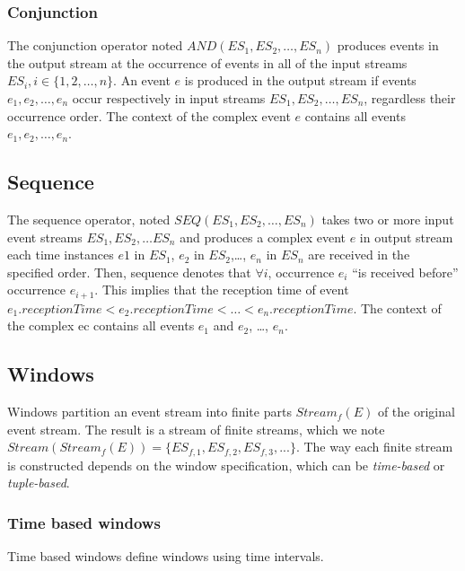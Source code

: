   \subsubsection{Conjunction}
  The conjunction operator noted $AND(ES_1, ES_2, …, ES_n)$ produces events in the output stream at the occurrence of events in all of the input streams $ES_i, i \in \{1, 2, …,n\}$. An event $e$ is produced in the output stream if events $e_1, e_2, …, e_n$ occur respectively in input streams $ES_1, ES_2, …, ES_n$, regardless their occurrence order. The context of the complex event $e$ contains all events $e_1, e_2, …, e_n$.
 
 \subsection{Sequence}
 The sequence operator, noted $SEQ(ES_1, ES_2, …, ES_n)$  takes two or more input event streams $ES_1, ES_2, … ES_n$ and produces a complex event $e$ in output stream each time instances $e1$ in $ES_1$, $e_2$ in $ES_2$,…, $e_n$ in $ES_n$ are received in the specified order. 
 Then, sequence denotes that $\forall i$, occurrence $e_i$ “is received before” occurrence $e_{i+1}$. 
 This implies that the reception time of event $e_1.receptionTime < e_2.receptionTime < …< e_n.receptionTime$.
 The context of the complex ec contains all events $e_1$ and $e_2$, …, $e_n$. 
 
 \subsection{Windows}
 Windows partition an event stream into finite parts $Stream_f(E)$ of the original event stream. The result is a stream of finite streams, which we note $Stream(Stream_f(E))= \{ES_{f,1}, ES_{f,2}, ES_{f,3}, ...\}$.
 The way each finite stream is constructed depends on the window specification, which can be \textit{time-based} or \textit{tuple-based}.
 \subsubsection{Time based windows}
Time based windows define windows using time intervals. 

